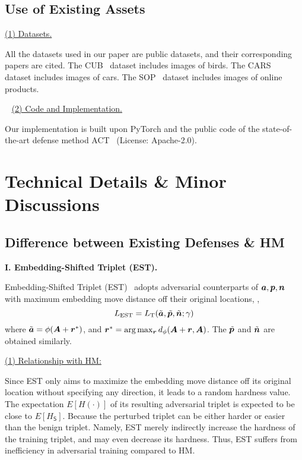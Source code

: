 \subsection{Use of Existing Assets}

\noindent\ul{(1) Datasets.}

All the datasets used in our paper are public datasets,
and their corresponding papers are cited.
%
The CUB~\cite{cub200} dataset includes images of birds.
%
The CARS~\cite{cars196} dataset includes images of cars.
%
The SOP~\cite{sop} dataset includes images of online products.

~\newline
\noindent\ul{(2) Code and Implementation.}

Our implementation is built upon PyTorch
and the public code of the state-of-the-art defense method ACT~\cite{robrank}
(License: Apache-2.0).

\section{Technical Details \& Minor Discussions}
\label{sec:b}

\subsection{Difference between Existing Defenses \& HM}
\label{sec:b1}

\noindent\textbf{I. Embedding-Shifted Triplet (EST).}~\cite{advrank}

Embedding-Shifted Triplet (EST)~\cite{advrank} adopts adversarial counterparts
of ${\bm{a}},{\bm{p}},{\bm{n}}$ with maximum embedding move distance off their original
locations, \ie,
%
\begin{equation}
%
L_\text{EST}=L_\text{T}(\tilde{\va},\tilde{\vp},\tilde{\vn};\gamma)
%
\end{equation}
%
where
$\tilde{{\bm{a}}}=\phi({\bm{A}}+{\bm{r}}^*)$, and ${\bm{r}}^*=\arg\max_{{\bm{r}}}d_\phi({\bm{A}}+{\bm{r}}, {\bm{A}})$.
%
The $\tilde{{\bm{p}}}$ and $\tilde{{\bm{n}}}$ are obtained similarly.

\ul{(1) Relationship with HM:}

Since EST only aims to maximize the embedding move distance off its original
location without specifying any direction, it leads to a random hardness value.
%
The expectation $E[H(\cdot)]$ of its resulting adversarial triplet is expected
to be close to $E[H_\mathsf{S}]$.
%
Because the perturbed triplet can be either harder or easier than the benign
triplet.
%
Namely, EST merely indirectly increase the hardness of the training triplet,
and may even decrease its hardness.
%
Thus, EST suffers from inefficiency in adversarial training compared to HM.

